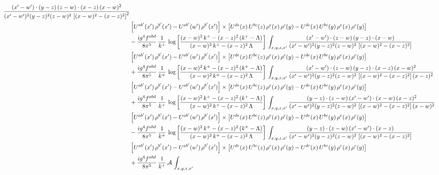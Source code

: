 \documentclass[9pt]{article}
\numberwithin{equation}{section}
\begin{document}
\begin{align}
\frac{(x'-w')\cdot(y-z)\,(z-w)\cdot(x-z)\,(x-w)^{2}}{(x'-w')^{2}(y-z)^{2}(z-w)^{2}\,\left[(x-w)^{2}-(x-z)^{2}\right]^{2}}\notag \\ 
&\left[U^{ab'}(x')\,\rho^{b'}(x')-U^{ab'}(w')\, \rho^{b'}(x')\right]\times \left[U^{de}(x)\,U^{bc}(z)\, \rho^{e}(x)\,\rho^{c}(y)-U^{de}(x)\,U^{bc}(y)\,\rho^{e}(x)\,\rho^{c}(y)\right]\notag \\ & -\frac{ig^{4}f^{abd}}{8\pi^{5}}\,\frac{1}{k^{+}}\,\log{\left[\frac{(x-w)^{2}\,k^{+}-(x-z)^{2}\,(k^{+}-\Lambda)}{(x-w)^{2}\,k^{+}-(x-z)^{2}\,\Lambda}\right]}\,\int_{x,y,z,x'}
\frac{(x'-w')\cdot(z-w)\,(y-z)\cdot(x-w)}{(x'-w')^{2}(y-z)^{2}(z-w)^{2}\,\left[(x-w)^{2}-(x-z)^{2}\right]}\notag \\ & \left[U^{ab'}(x')\,\rho^{b'}(x')-U^{ab'}(w')\, \rho^{b'}(x')\right]\times \left[U^{de}(x)\,U^{bc}(z)\, \rho^{e}(x)\,\rho^{c}(y)-U^{de}(x)\,U^{bc}(y)\,\rho^{e}(x)\,\rho^{c}(y)\right]\notag \\ &  +\frac{ig^{4}f^{abd}}{8\pi^{5}}\,\frac{1}{k^{+}}\,\log{\left[\frac{(x-w)^{2}\,k^{+}-(x-z)^{2}\,(k^{+}-\Lambda)}{(x-w)^{2}\,k^{+}-(x-z)^{2}\,\Lambda}\right]}\,\int_{x,y,z,x'}
\frac{(x'-w')\cdot(z-w)\,(y-z)\cdot(x-z)\,(x-w)^{2}}{(x'-w')^{2}(y-z)^{2}(z-w)^{2}\,\left[(x-w)^{2}-(x-z)^{2}\right](x-z)^{2}}\notag \\ & \left[U^{ab'}(x')\,\rho^{b'}(x')-U^{ab'}(w')\, \rho^{b'}(x')\right]\times \left[U^{de}(x)\,U^{bc}(z)\, \rho^{e}(x)\,\rho^{c}(y)-U^{de}(x)\,U^{bc}(y)\,\rho^{e}(x)\,\rho^{c}(y)\right]\notag \\ & +\frac{ig^{4}f^{abd}}{8\pi^{5}}\,\frac{1}{k^{+}}\,\log{\left[\frac{(x-w)^{2}\,k^{+}-(x-z)^{2}\,(k^{+}-\Lambda)}{(x-w)^{2}\,k^{+}-(x-z)^{2}\,\Lambda}\right]}\,\int_{x,y,z,x'}
\frac{(y-z)\cdot(z-w)\,(x'-w')\cdot(x-w)\,(x-z)^{2}}{(x'-w')^{2}(y-z)^{2}(z-w)^{2}\,\left[(x-w)^{2}-(x-z)^{2}\right](x-w)^{2}}\notag \\ 
& \left[U^{ab'}(x')\,\rho^{b'}(x')-U^{ab'}(w')\, \rho^{b'}(x')\right]\times \left[U^{de}(x)\,U^{bc}(z)\, \rho^{e}(x)\,\rho^{c}(y)-U^{de}(x)\,U^{bc}(y)\,\rho^{e}(x)\,\rho^{c}(y)\right]\notag \\ & -\frac{ig^{4}f^{abd}}{8\pi^{5}}\,\frac{1}{k^{+}}\,\log{\left[\frac{(x-w)^{2}\,k^{+}-(x-z)^{2}\,(k^{+}-\Lambda)}{(x-w)^{2}\,k^{+}-(x-z)^{2}\,\Lambda}\right]}\,\int_{x,y,z,x'}
\frac{(y-z)\cdot(z-w)\,(x'-w')\cdot(x-z)}{(x'-w')^{2}(y-z)^{2}(z-w)^{2}\,\left[(x-w)^{2}-(x-z)^{2}\right]}\notag \\ & \left[U^{ab'}(x')\,\rho^{b'}(x')-U^{ab'}(w')\, \rho^{b'}(x')\right]\times \left[U^{de}(x)\,U^{bc}(z)\, \rho^{e}(x)\,\rho^{c}(y)-U^{de}(x)\,U^{bc}(y)\,\rho^{e}(x)\,\rho^{c}(y)\right]\notag \\ & +\frac{ig^{4}f^{abd}}{8\pi^{5}}\,\frac{1}{k^{+}}\,\mathcal{A}\,\int_{x,y,z,x'}

\end{align}
\end{document}
